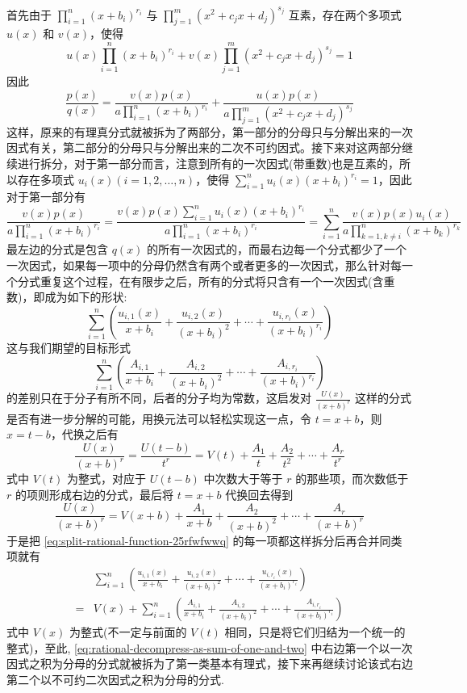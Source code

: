 首先由于 $\prod_{i=1}^n(x+b_i)^{r_i}$ 与  $\prod_{j=1}^m(x^2+c_j x + d_j)^{s_j}$ 互素，存在两个多项式 $u(x)$ 和 $v(x)$，使得
\[ u(x) \prod_{i=1}^n(x+b_i)^{r_i} + v(x) \prod_{j=1}^m(x^2+c_j x + d_j)^{s_j} = 1 \]
因此
\begin{equation}
  \label{eq:rational-decompress-as-sum-of-one-and-two}
\frac{p(x)}{q(x)} = \frac{v(x)p(x)}{a \prod_{i=1}^n(x+b_i)^{r_i}} + \frac{u(x)p(x)}{a \prod_{j=1}^m(x^2+c_j x + d_j)^{s_j}}
\end{equation}
这样，原来的有理真分式就被拆为了两部分，第一部分的分母只与分解出来的一次因式有关，第二部分的分母只与分解出来的二次不可约因式。接下来对这两部分继续进行拆分，对于第一部分而言，注意到所有的一次因式(带重数)也是互素的，所以存在多项式 $u_i(x)(i=1,2,\ldots,n)$，使得 $\sum_{i=1}^{n}u_i(x)(x+b_i)^{r_i}=1$，因此对于第一部分有
\[ \frac{v(x)p(x)}{a \prod_{i=1}^n(x+b_i)^{r_i}} = \frac{v(x)p(x)\sum_{i=1}^{n}u_i(x)(x+b_i)^{r_i}}{a \prod_{i=1}^n(x+b_i)^{r_i}} = \sum_{i=1}^{n} \frac{v(x)p(x)u_i(x)}{a \prod_{k=1,k \neq i}^n(x+b_k)^{r_k}}  \]
最左边的分式是包含 $q(x)$ 的所有一次因式的，而最右边每一个分式都少了一个一次因式，如果每一项中的分母仍然含有两个或者更多的一次因式，那么针对每一个分式重复这个过程，在有限步之后，所有的分式将只含有一个一次因式(含重数)，即成为如下的形状:
\begin{equation}
    \label{eq:split-rational-function-25rfwfwwq}
\sum_{i=1}^{n} \left( \frac{u_{i,1}(x)}{x+b_i} + \frac{u_{i,2}(x)}{(x+b_i)^2} + \cdots + \frac{u_{i,r_i}(x)}{(x+b_i)^{r_i}}  \right) 
\end{equation}
这与我们期望的目标形式
\[  \sum_{i=1}^{n} \left( \frac{A_{i,1}}{x+b_i} + \frac{A_{i,2}}{(x+b_i)^2} + \cdots + \frac{A_{i,r_i}}{(x+b_i)^{r_i}}  \right) \]
的差别只在于分子有所不同，后者的分子均为常数，这启发对
$ \frac{U(x)}{(x+b)^r} $
这样的分式是否有进一步分解的可能，用换元法可以轻松实现这一点，令 $t=x+b$，则 $x=t-b$，代换之后有
\[ \frac{U(x)}{(x+b)^r} = \frac{U(t-b)}{t^r} = V(t) + \frac{A_1}{t} + \frac{A_2}{t^2} + \cdots + \frac{A_r}{t^r} \]
式中 $V(t)$ 为整式，对应于 $U(t-b)$ 中次数大于等于 $r$ 的那些项，而次数低于 $r$ 的项则形成右边的分式，最后将 $t=x+b$ 代换回去得到
\[ \frac{U(x)}{(x+b)^r} = V(x+b) + \frac{A_1}{x+b} + \frac{A_2}{(x+b)^2} + \cdots + \frac{A_r}{(x+b)^{r}} \]
于是把 \autoref{eq:split-rational-function-25rfwfwwq} 的每一项都这样拆分后再合并同类项就有
\begin{align*}
 &\sum_{i=1}^{n} \left( \frac{u_{i,1}(x)}{x+b_i} + \frac{u_{i,2}(x)}{(x+b_i)^2} + \cdots + \frac{u_{i,r_i}(x)}{(x+b_i)^{r_i}}  \right) \\
 = & V(x) + \sum_{i=1}^{n} \left( \frac{A_{i,1}}{x+b_i} + \frac{A_{i,2}}{(x+b_i)^2} + \cdots + \frac{A_{i,r_i}}{(x+b_i)^{r_i}}  \right)
\end{align*}
式中 $V(x)$ 为整式(不一定与前面的 $V(t)$ 相同，只是将它们归结为一个统一的整式)，至此, \autoref{eq:rational-decompress-as-sum-of-one-and-two} 中右边第一个以一次因式之积为分母的分式就被拆为了第一类基本有理式，接下来再继续讨论该式右边第二个以不可约二次因式之积为分母的分式.

